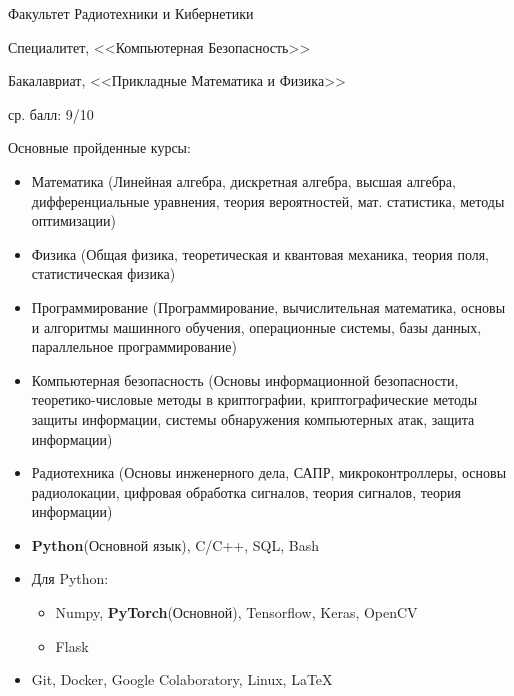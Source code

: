Факультет Радиотехники и Кибернетики

Специалитет, <<Компьютерная Безопасность>>

Бакалавриат, <<Прикладные Математика и Физика>>

ср. балл: 9/10

Основные пройденные курсы:

\begin{itemize}
	\item Математика (Линейная алгебра, дискретная алгебра, высшая алгебра, дифференциальные уравнения, теория вероятностей, мат. статистика, методы оптимизации)
	\item Физика (Общая физика, теоретическая и квантовая механика, теория поля, статистическая физика)
	\item Программирование (Программирование, вычислительная математика, основы и алгоритмы машинного обучения, операционные системы, базы данных, параллельное программирование)
	\item Компьютерная безопасность (Основы информационной безопасности, теоретико-числовые методы в криптографии, криптографические методы защиты информации, системы обнаружения компьютерных атак, защита информации)
	\item Радиотехника (Основы инженерного дела, САПР, микроконтроллеры, основы радиолокации, цифровая обработка сигналов, теория сигналов, теория информации)
\end{itemize}

\begin{itemize}
    \item \textbf{Python}(Основной язык), C/C++, SQL, Bash
    \item Для Python:
    \begin{itemize}
    	\item Numpy, \textbf{PyTorch}(Основной), Tensorflow, Keras, OpenCV
    	\item Flask
    \end{itemize}    
    \item Git, Docker, Google Colaboratory, Linux, \LaTeX
\end{itemize}



